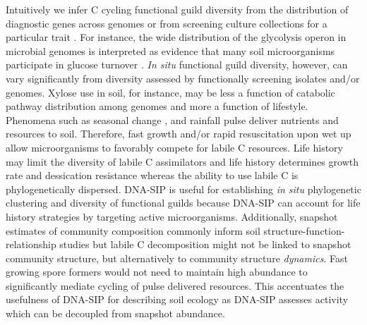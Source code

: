 Intuitively we infer C cycling functional guild diversity from the distribution
of diagnostic genes across genomes \citep{Berlemont2013} or from screening
culture collections for a particular trait \citep{Martiny2013}. For
instance, the wide distribution of the glycolysis operon in microbial
genomes is interpreted as evidence that many soil microorganisms
participate in glucose turnover \citep{McGuire2010}. \textit{In situ}
functional guild diversity, however, can vary significantly from diversity
assessed by functionally screening isolates and/or genomes. Xylose use in
soil, for instance, may be less a function of catabolic pathway
distribution among genomes and more a function of lifestyle. Phenomena
such as seasonal change \citep{Schmidt2007}, and rainfall
\citep{Placella2012} pulse deliver nutrients and resources to soil.
Therefore, fast growth and/or rapid resuscitation upon wet up
\citep{Placella2012} allow microorganisms to favorably compete for labile
C resources. Life history may limit the diversity of labile C assimilators
and life history determines growth rate and dessication resistance whereas
the ability to use labile C is phylogenetically dispersed. DNA-SIP is
useful for establishing \textit{in situ} phylogenetic clustering and
diversity of functional guilds because DNA-SIP can account for life
history strategies by targeting active microorganisms. Additionally,
snapshot estimates of community composition commonly inform soil
structure-function-relationship studies \citep{Fierer} but
labile C decomposition might not be linked to snapshot community
structure, but alternatively to community structure \textit{dynamics}.
Fast growing spore formers would not need to maintain high abundance to
significantly mediate cycling of pulse delivered resources. This
accentuates the usefulness of DNA-SIP for describing soil ecology as
DNA-SIP assesses activity which can be decoupled from snapshot abundance.


